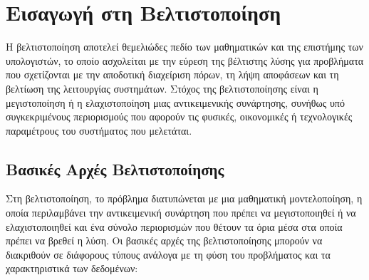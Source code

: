 \gr
\chapter{Εισαγωγή στη Βελτιστοποίηση}
Η βελτιστοποίηση αποτελεί θεμελιώδες πεδίο των μαθηματικών και της επιστήμης των υπολογιστών, το οποίο ασχολείται με την εύρεση της βέλτιστης λύσης για προβλήματα που σχετίζονται με την αποδοτική διαχείριση πόρων, τη λήψη αποφάσεων και τη βελτίωση της λειτουργίας συστημάτων. Στόχος της βελτιστοποίησης είναι η μεγιστοποίηση ή η ελαχιστοποίηση μιας αντικειμενικής συνάρτησης, συνήθως υπό συγκεκριμένους περιορισμούς που αφορούν τις φυσικές, οικονομικές ή τεχνολογικές παραμέτρους του συστήματος που μελετάται.

\section{Βασικές Αρχές Βελτιστοποίησης}
Στη βελτιστοποίηση, το πρόβλημα διατυπώνεται με μια μαθηματική μοντελοποίηση, η οποία περιλαμβάνει την αντικειμενική συνάρτηση που πρέπει να μεγιστοποιηθεί ή να ελαχιστοποιηθεί και ένα σύνολο περιορισμών που θέτουν τα όρια μέσα στα οποία πρέπει να βρεθεί η λύση. Οι βασικές αρχές της βελτιστοποίησης μπορούν να διακριθούν σε διάφορους τύπους ανάλογα με τη φύση του προβλήματος και τα χαρακτηριστικά των δεδομένων:
